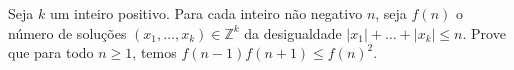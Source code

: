 Seja \(k\) um inteiro positivo. Para cada inteiro não negativo \(n\), seja \(f(n)\) o número de soluções \((x_1,\ldots,x_k)\in\mathbb{Z}^k\) da desigualdade \(|x_1|+\dots+|x_k|\leq n\). Prove que para todo \(n\ge1\), temos \(f(n-1)f(n+1)\leq f(n)^2\).
